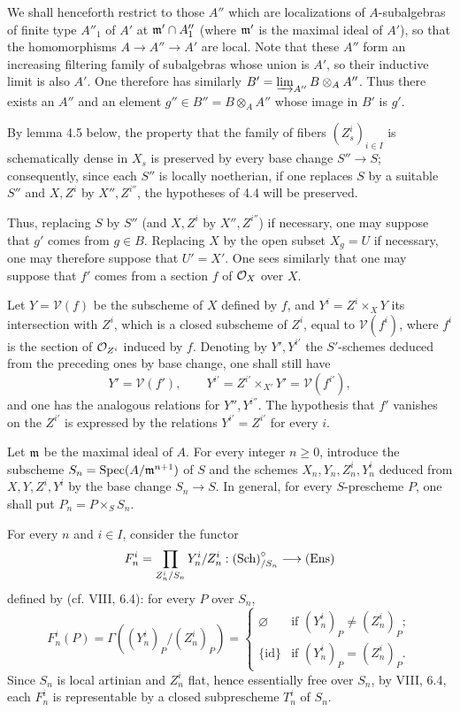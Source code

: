 We shall henceforth restrict to those $A''$ which are localizations of $A$-subalgebras of finite type $A''_1$ of $A'$ at $\mathfrak m'\cap A''_1$ (where $\mathfrak m'$ is the maximal ideal of $A'$), so that the homomorphisms $A\to A''\to A'$ are local. Note that these $A''$ form an increasing filtering family of subalgebras whose union is $A'$, so their inductive limit is also $A'$. One therefore has similarly $B'=\varinjlim_{A''}B\otimes_A A''$. Thus there exists an $A''$ and an element $g''\in B''=B\otimes_A A''$ whose image in $B'$ is $g'$.

 By lemma 4.5 below, the property that the family of fibers $(Z^i_s)_{i\in I}$ is schematically dense in $X_s$ is preserved by every base change $S''\to S$; consequently, since each $S''$ is locally noetherian, if one replaces $S$ by a suitable $S''$ and $X,Z^i$ by $X'',Z^{i''}$, the hypotheses of 4.4 will be preserved.

Thus, replacing $S$ by $S''$ (and $X,Z^i$ by $X'',Z^{i''}$) if necessary, one may suppose that $g'$ comes from $g\in B$. Replacing $X$ by the open subset $X_g=U$ if necessary, one may therefore suppose that $U'=X'$. One sees similarly that one may suppose that $f'$ comes from a section $f$ of $\mathcal{O}_X$ over $X$.

Let $Y=\mathcal V(f)$ be the subscheme of $X$ defined by $f$, and $Y^i=Z^i\times_X Y$ its intersection with $Z^i$, which is a closed subscheme of $Z^i$, equal to $\mathcal V(f^i)$, where $f^i$ is the section of $\mathcal{O}_{Z^i}$ induced by $f$. Denoting by $Y',Y^{i'}$ the $S'$-schemes deduced from the preceding ones by base change, one shall still have
\[
Y'=\mathcal V(f'),\qquad Y^{i'}=Z^{i'}\times_{X'}Y'=\mathcal V(f^{i'}),
\]
and one has the analogous relations for $Y'',Y^{i''}$. The hypothesis that $f'$ vanishes on the $Z^{i'}$ is expressed by the relations $Y^{i'}=Z^{i'}$ for every $i$.

Let $\mathfrak m$ be the maximal ideal of $A$. For every integer $n\geq0$, introduce the subscheme $S_n=\operatorname{Spec}(A/\mathfrak m^{n+1})$ of $S$ and the schemes $X_n,Y_n,Z^i_n,Y^i_n$ deduced from $X,Y,Z^i,Y^i$ by the base change $S_n\to S$. In general, for every $S$-prescheme $P$, one shall put $P_n=P\times_S S_n$.

For every $n$ and $i\in I$, consider the functor
\[
F^i_n=\prod_{Z^i_n/S_n}Y^i_n/Z^i_n:\textup{(Sch)}_{/S_n}^{\circ}\longrightarrow\textup{(Ens)}
\]
defined by (cf. VIII, 6.4): for every $P$ over $S_n$,
\[
F^i_n(P)=\Gamma((Y^i_n)_P/(Z^i_n)_P)=
\begin{cases}\varnothing&\text{if }(Y^i_n)_P\ne(Z^i_n)_P;\\\{\mathrm{id}\}&\text{if }(Y^i_n)_P=(Z^i_n)_P.\end{cases}
\]
Since $S_n$ is local artinian and $Z^i_n$ flat, hence essentially free over $S_n$, by VIII, 6.4, each $F^i_n$ is representable by a closed subprescheme $T^i_n$ of $S_n$.

